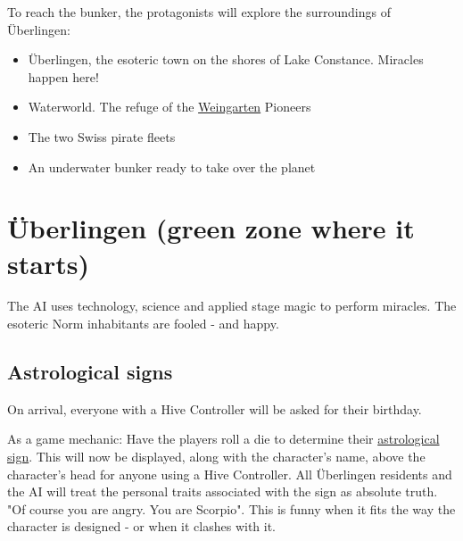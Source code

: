 To reach the bunker, the protagonists will explore the surroundings of Überlingen:
\begin{itemize}
    \item {Überlingen, the esoteric town on the shores of Lake Constance. Miracles happen here!}
    \item {Waterworld. The refuge of the \hyperref[subsec:Weingarten]{Weingarten} Pioneers}
    \item {The two Swiss pirate fleets}
    \item {An underwater bunker ready to take over the planet}
\end{itemize}


\section{Überlingen (green zone where it starts)}

The AI uses technology, science and applied stage magic to perform miracles. The esoteric Norm inhabitants are fooled - and happy.

\subsection{Astrological signs}

On arrival, everyone with a Hive Controller will be asked for their birthday.

As a game mechanic: Have the players roll a die to determine their \href{https://en.wikipedia.org/wiki/Astrological_sign}{astrological sign}. This will now be displayed, along with the character's name, above the character's head for anyone using a Hive Controller.
All Überlingen residents and the AI will treat the personal traits associated with the sign as absolute truth. "Of course you are angry. You are Scorpio". This is funny when it fits the way the character is designed - or when it clashes with it.

